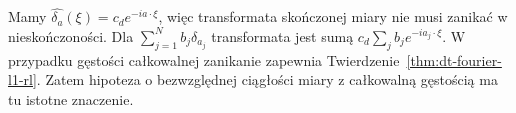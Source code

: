 \begin{przyklad}
\label{ex:dt-fourier-measure-atoms}
Mamy $\widehat{\delta_a}(\xi)=c_de^{-ia\cdot\xi}$,
więc transformata skończonej miary nie musi zanikać
w nieskończoności. Dla $\sum_{j=1}^N b_j\delta_{a_j}$
transformata jest sumą $c_d\sum_j b_je^{-ia_j\cdot\xi}$.
W przypadku gęstości całkowalnej zanikanie zapewnia
Twierdzenie~\ref{thm:dt-fourier-l1-rl}. Zatem hipoteza
o bezwzględnej ciągłości miary z całkowalną gęstością
ma tu istotne znaczenie.
\end{przyklad}

